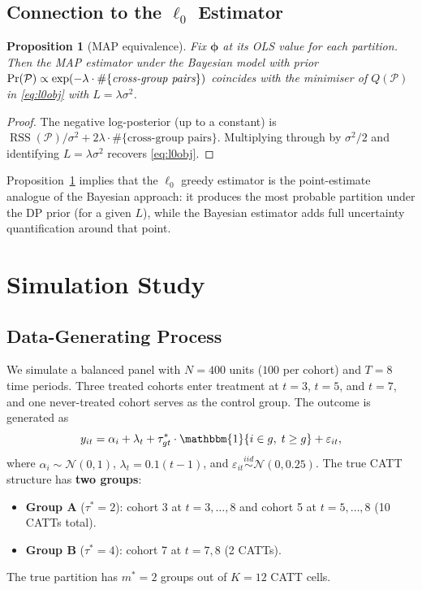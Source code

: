 \documentclass[margin=3in, 12pt]{article}
\newtheorem{proposition}{Proposition}
\DeclareMathOperator{\RSS}{RSS}
\newcommand{\Normal}{\mathcal{N}}
\newcommand{\1}{\mathbbm{1}}
\begin{document}
\subsection{Connection to the $\ell_0$ Estimator}

\begin{proposition}[MAP equivalence]
  \label{prop:map}
  Fix $\bm{\phi}$ at its OLS value for each partition. Then the MAP
  estimator under the Bayesian model with prior
  $\Pr(\mathcal{P}) \propto \exp(-\lambda \cdot \#\{\emph{cross-group pairs}\})$
  coincides with the minimiser of $Q(\mathcal{P})$ in \eqref{eq:l0obj}
  with $L = \lambda\sigma^2$.
\end{proposition}

\begin{proof}
  The negative log-posterior (up to a constant) is
  $\RSS(\mathcal{P})/\sigma^2 + 2\lambda \cdot \#\{\text{cross-group pairs}\}$.
  Multiplying through by $\sigma^2/2$ and identifying $L = \lambda\sigma^2$
  recovers \eqref{eq:l0obj}.
\end{proof}

Proposition~\ref{prop:map} implies that the $\ell_0$ greedy estimator is the
point-estimate analogue of the Bayesian approach: it produces the most
probable partition under the DP prior (for a given $L$), while the Bayesian
estimator adds full uncertainty quantification around that point.

\section{Simulation Study}
\label{sec:sim}

\subsection{Data-Generating Process}

We simulate a balanced panel with $N = 400$ units ($100$ per cohort) and
$T = 8$ time periods. Three treated cohorts enter treatment at $t = 3$, $t = 5$,
and $t = 7$, and one never-treated cohort serves as the control group.
The outcome is generated as
\begin{equation}
  y_{it} = \alpha_i + \lambda_t + \tau^*_{gt}\cdot\1\{i\in g,\;t\geq g\} + \varepsilon_{it},
\end{equation}
where $\alpha_i \sim \Normal(0,1)$, $\lambda_t = 0.1(t-1)$, and
$\varepsilon_{it} \overset{iid}{\sim} \Normal(0, 0.25)$.
The true CATT structure has \textbf{two groups}:
\begin{itemize}[nosep]
  \item \textbf{Group A} ($\tau^* = 2$): cohort 3 at $t=3,\ldots,8$ and
    cohort 5 at $t=5,\ldots,8$ (10 CATTs total).
  \item \textbf{Group B} ($\tau^* = 4$): cohort 7 at $t=7,8$ (2 CATTs).
\end{itemize}
The true partition has $m^* = 2$ groups out of $K = 12$ CATT cells.
\end{document}
